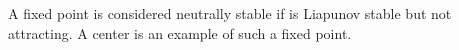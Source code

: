 \documentclass[12pt]{article}
\begin{document}
A fixed point is considered neutrally stable if is Liapunov stable but not attracting. A center is an example of such a fixed point.
\end{document}
